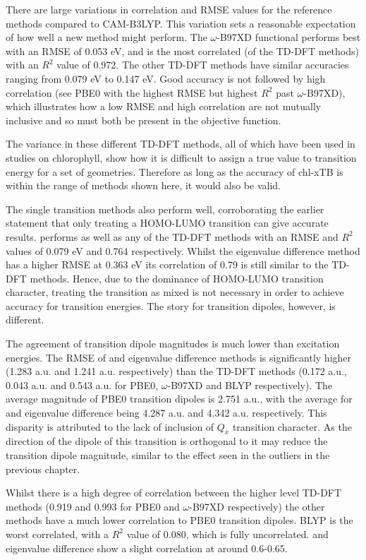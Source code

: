 There are large variations in correlation and RMSE values for the reference methods
compared to CAM-B3LYP. This variation sets a reasonable expectation of how well
a new method might perform. The $\omega$-B97XD functional performs best with an 
RMSE of 0.053 eV, and is the most correlated (of the TD-DFT methods) with an $R^2$
value of 0.972. The other TD-DFT methods have similar accuracies ranging from 0.079
eV to 0.147 eV. Good accuracy is not followed by high correlation (see PBE0 with 
the highest RMSE but highest $R^2$ past $\omega$-B97XD), which illustrates how a
low RMSE and high correlation are not mutually inclusive and so must both be present
in the objective function. 

The variance in these different TD-DFT methods, all of which have been used in studies
on chlorophyll, show how it is difficult to assign a true value to transition energy
for a set of geometries. Therefore as long as the accuracy of chl-xTB is within 
the range of methods shown here, it would also be valid.

The single transition methods also perform well, corroborating the earlier statement
that only treating a HOMO-LUMO transition can give accurate results. \dscf performs
as well as any of the TD-DFT methods with an RMSE and $R^2$ values of 0.079 eV and
0.764 respectively. Whilst the eigenvalue difference method has a higher RMSE at
0.363 eV its correlation of 0.79 is still similar to the TD-DFT methods. Hence,
due to the dominance of HOMO-LUMO transition character, treating the transition
as mixed is not necessary in order to achieve accuracy for transition energies. 
The story for transition dipoles, however, is different.

The agreement of transition dipole magnitudes is much lower than excitation energies.
The RMSE of \dscf and eigenvalue difference methods is significantly higher (1.283
a.u. and 1.241 a.u. respectively) than the TD-DFT methods (0.172 a.u., 0.043 a.u.
and 0.543 a.u. for PBE0, $\omega$-B97XD and BLYP respectively). The average magnitude
of PBE0 transition dipoles is 2.751 a.u., with the average for \dscf and eigenvalue 
difference being 4.287 a.u. and 4.342 a.u. respectively. This disparity is attributed
to the lack of inclusion of $Q_x$ transition character. As the direction of the dipole
of this transition is orthogonal to \Qy it may reduce the transition dipole magnitude, 
similar to the effect seen in the outliers in the previous chapter.

Whilst there is a high degree of correlation between the higher level TD-DFT methods
(0.919 and 0.993 for PBE0 and $\omega$-B97XD respectively) the other methods
have a much lower correlation to PBE0 transition dipoles. BLYP is the worst correlated,
with a $R^2$ value of 0.080, which is fully uncorrelated. \dscf and eigenvalue difference
show a slight correlation at around 0.6-0.65.

